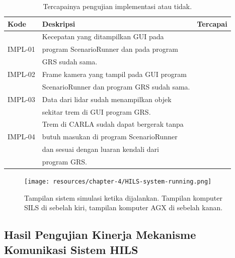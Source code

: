 \begin{table}[!htbp]
	\begin{center}
		\begin{tabular}{|l|l|l|}
			\hline
			\textbf{Kode} & \textbf{Deskripsi}                         & \textbf{Tercapai} \\
			\hline
			              & Kecepatan yang ditampilkan GUI pada        &                   \\
			IMPL-01       & program ScenarioRunner dan pada program    & \checkmark        \\
			              & GRS sudah sama.                            &                   \\
			\hline
			IMPL-02       & Frame kamera yang tampil pada GUI program  & \checkmark        \\
			              & ScenarioRunner dan program GRS sudah sama. &                   \\
			\hline
			IMPL-03       & Data dari lidar sudah menampilkan objek    & \checkmark        \\
			              & sekitar trem di GUI program GRS.           &                   \\
			\hline
			              & Trem di CARLA sudah dapat bergerak tanpa   &                   \\
			IMPL-04       & butuh masukan di program ScenarioRunner    & \checkmark        \\
			              & dan sesuai dengan luaran kendali dari      &                   \\
			              & program GRS.                               &                   \\
			\hline
		\end{tabular}
	\end{center}

	\caption{Tercapainya pengujian implementasi atau tidak.}
	\label{chapter-4-tbl-impl-criteria-result}
\end{table}

\begin{figure}[!htbp]
	\centering
	\texttt{[image: resources/chapter-4/HILS-system-running.png]}
	\caption{Tampilan sistem simulasi ketika dijalankan. Tampilan komputer SILS
		di sebelah kiri, tampilan komputer AGX di sebelah kanan.}
	\label{chapter-4-fig-hils-running}
\end{figure}

\subsection{Hasil Pengujian Kinerja Mekanisme Komunikasi Sistem HILS}

